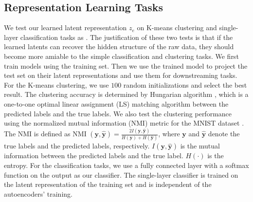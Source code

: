 \documentclass[letterpaper]{article} %
\begin{document}
\subsection{Representation Learning Tasks}
\label{sb: downstreamtasks}
We test our learned latent representation $z_e$ on K-means clustering and single-layer classification tasks as \cite{DBLP:journals/corr/abs-1807-07543}. The justification of these two tests is that if the learned latents can recover the hidden structure of the raw data, they should become more amiable to the simple classification and clustering tasks. We first train models using the training set. Then we use the trained model to project the test set on their latent representations and use them for downstreaming tasks.  For the K-means clustering, we use $100$ random initializations and select the best result. The clustering accuracy is determined by Hungarian algorithm \cite{xie:16:icml}, which is a one-to-one optimal linear assignment (LS) matching algorithm between the predicted labels and the true labels. We also test the clustering performance using the normalized mutual information (NMI) metric for the MNIST dataset \cite{Somvae} \cite{DBLP:journals/corr/abs-1801-07648}. The NMI is defined as NMI $(\mathbf{y}, \hat{\mathbf{y}}) = \frac{2I(\mathbf{y}, \hat{\mathbf{y}})}{H(\mathbf{y}) + H(\hat{\mathbf{y}})}$, where $\mathbf{y}$ and $\hat{\mathbf{y}}$ denote the true labels and the predicted labels, respectively. $I(\mathbf{y}, \hat{\mathbf{y}})$ is the mutual information between the predicted labels and the true label. $H(\cdot)$ is the entropy. For the classification tasks, we use a fully connected layer with a softmax function on the output as our classifier. The single-layer classifier is trained on the latent representation of the training set and is independent of the autoencoders' training.
\begin{table}[!ht]
\caption{Accuracy of downstream tasks of MNIST.}
\centering
{}
\label{MNIST_table}
\end{table}
\end{document}
